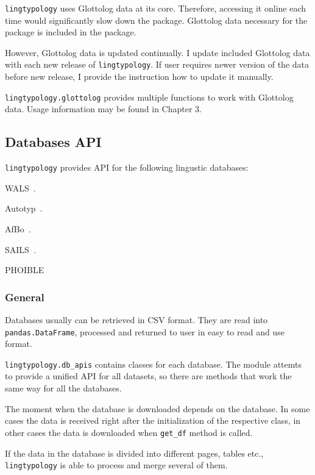 \documentclass[a4paper,12pt]{article}
\begin{document}
\texttt{lingtypology} uses Glottolog data at its core. Therefore, accessing it online each time would significantly slow down the package. Glottolog data necessary for the package is included in the package.

However, Glottolog data is updated continually. I update included Glottolog data with each new release of \texttt{lingtypology}. If user requires newer version of the data before new release, I provide the instruction how to update it manually.

\texttt{lingtypology.glottolog} provides multiple functions to work with Glottolog data. Usage information may be found in Chapter 3.

\subsection{Databases API}

\texttt{lingtypology} provides API for the following lingustic databases:
\begin{itemize}
\begin{samepage}
 \item WALS~\parencite{wals}.
 \item Autotyp~\parencite{autotyp}.
 \item AfBo~\parencite{afbo}.
 \item SAILS~\parencite{sails}.
 \item PHOIBLE~\parencite{phoible}
\end{samepage}
\end{itemize}

\subsubsection{General}
Databases usually can be retrieved in CSV format. They are read into \texttt{pandas.DataFrame}, processed and returned to user in easy to read and use format.

\texttt{lingtypology.db\_apis} contains classes for each database. The module attemts to provide a unified API for all datasets, so there are methods that work the same way for all the databases.

The moment when the database is downloaded depends on the database. In some cases the data is received right after the initialization of the respective class, in other cases the data is downloaded when \texttt{get\_df} method is called.

If the data in the database is divided into different pages, tables etc., \texttt{lingtypology} is able to process and merge several of them.
\end{document}
